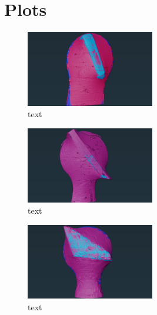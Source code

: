 \printbibliography
\newpage

\appendix
\noindent
\twocolumn
\section{Plots}

\begin{figure}
	\includegraphics[width=0.5\textwidth]{images/avizo_flats/tlys2.jpg}
	\caption{text}
 \label{tlys2}
\end{figure}
\begin{figure}
	\includegraphics[width=0.5\textwidth]{images/avizo_flats/tlys_9.jpg}
	\caption{text}
 \label{tlys9}
\end{figure}
\begin{figure}
	\includegraphics[width=0.5\textwidth]{images/avizo_flats/cas3_1118.jpg}
	\caption{text}
 \label{cas3}
\end{figure}



